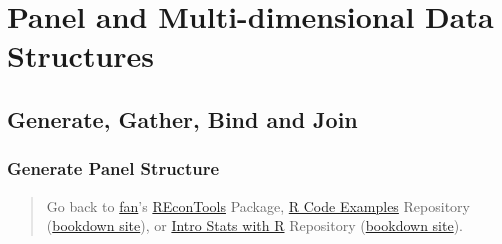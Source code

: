 \documentclass[
]{book}
\begin{document}
\begin{table}[!h]
\centering
{}
\end{table}

\hypertarget{panel-and-multi-dimensional-data-structures}{%
\chapter{Panel and Multi-dimensional Data Structures}\label{panel-and-multi-dimensional-data-structures}}

\hypertarget{generate-gather-bind-and-join}{%
\section{Generate, Gather, Bind and Join}\label{generate-gather-bind-and-join}}

\hypertarget{generate-panel-structure}{%
\subsection{Generate Panel Structure}\label{generate-panel-structure}}

\begin{quote}
Go back to \href{http://fanwangecon.github.io/}{fan}'s \href{https://fanwangecon.github.io/REconTools/}{REconTools} Package, \href{https://fanwangecon.github.io/R4Econ/}{R Code Examples} Repository (\href{https://fanwangecon.github.io/R4Econ/bookdown}{bookdown site}), or \href{https://fanwangecon.github.io/Stat4Econ/}{Intro Stats with R} Repository (\href{https://fanwangecon.github.io/Stat4Econ/bookdown}{bookdown site}).
\end{quote}
\end{document}
